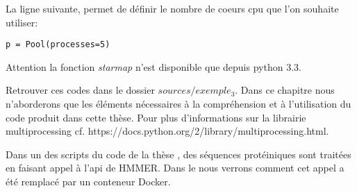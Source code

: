 La ligne suivante, permet de définir le nombre de coeurs \gls{cpu} que l'on souhaite utiliser: 

\begin{lstlisting}[frame=single]
p = Pool(processes=5)
\end{lstlisting} 

Attention la fonction \emph{starmap} n'est disponible que depuis python 3.3.

Retrouver ces codes dans le dossier \emph{$sources/exemple_3$}. Dans ce chapitre nous n'aborderons que les éléments nécessaires à la compréhension et à l'utilisation du code produit dans cette thèse. Pour plus d'informations sur la librairie multiprocessing cf. https://docs.python.org/2/library/multiprocessing.html.

Dans un des scripts du code de la thèse \thLeite , des séquences protéiniques sont traitées en faisant appel à l'\gls{api} de HMMER. Dans le  nous verrons comment cet appel a été remplacé par un conteneur Docker.






































